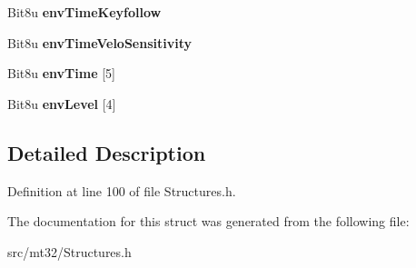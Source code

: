 \begin{DoxyCompactItemize}
\item 
\hypertarget{structMT32Emu_1_1TimbreParam_1_1PartialParam_1_1TVAParam_a40330e83712a04cc3245cf56c92d871f}{Bit8u {\bfseries env\-Time\-Keyfollow}}\label{structMT32Emu_1_1TimbreParam_1_1PartialParam_1_1TVAParam_a40330e83712a04cc3245cf56c92d871f}

\item 
\hypertarget{structMT32Emu_1_1TimbreParam_1_1PartialParam_1_1TVAParam_afb252a944aa4143ab9bd8a6bdfe909b3}{Bit8u {\bfseries env\-Time\-Velo\-Sensitivity}}\label{structMT32Emu_1_1TimbreParam_1_1PartialParam_1_1TVAParam_afb252a944aa4143ab9bd8a6bdfe909b3}

\item 
\hypertarget{structMT32Emu_1_1TimbreParam_1_1PartialParam_1_1TVAParam_a2c68bf97cc816c213ed0a6289f5d435a}{Bit8u {\bfseries env\-Time} \mbox{[}5\mbox{]}}\label{structMT32Emu_1_1TimbreParam_1_1PartialParam_1_1TVAParam_a2c68bf97cc816c213ed0a6289f5d435a}

\item 
\hypertarget{structMT32Emu_1_1TimbreParam_1_1PartialParam_1_1TVAParam_a9ea01baf6739d9dc3863e55620e8fe77}{Bit8u {\bfseries env\-Level} \mbox{[}4\mbox{]}}\label{structMT32Emu_1_1TimbreParam_1_1PartialParam_1_1TVAParam_a9ea01baf6739d9dc3863e55620e8fe77}

\end{DoxyCompactItemize}


\subsection{Detailed Description}


Definition at line 100 of file Structures.\-h.



The documentation for this struct was generated from the following file\-:\begin{DoxyCompactItemize}
\item 
src/mt32/Structures.\-h\end{DoxyCompactItemize}
